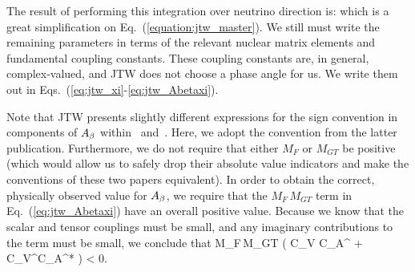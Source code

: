 

The result of performing this integration over neutrino direction is:
\unskip which is a great simplification on Eq.~(\ref{equation:jtw_master}).  We still must write the remaining parameters in terms of the relevant nuclear matrix elements and fundamental coupling constants.  These coupling constants are, in general, complex-valued, and JTW does not choose a phase angle for us.  We write them out in 
Eqs.~(\ref{eq:jtw_xi}-\ref{eq:jtw_Abetaxi}).

Note that JTW presents slightly different expressions for the sign convention in components of $A_{\beta}$ within~\cite{jtw} and~\cite{jtw_coulomb}.  Here, we adopt the convention from the latter publication.  Furthermore, we do not require that either $M_F$ or $M_{GT}$ be positive (which would allow us to safely drop their absolute value indicators and make the conventions of these two papers equivalent).  In order to obtain the correct, physically observed value for $A_{\beta}$, we require that the 
$M_{F}\,M_{GT}$ term in Eq.~(\ref{eq:jtw_Abetaxi}) have an overall positive value.  Because we know that the scalar and tensor couplings must be small, and any imaginary contributions to the term must be small, we conclude that
\bea
	M_{F}\,M_{GT} \left( C_V C_A^{\prime *} + C_V^\prime C_A^* \right) < 0.
\eea


